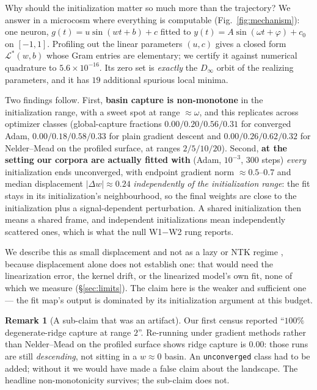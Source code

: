 \documentclass[10pt,letterpaper]{article}
\theoremstyle{definition}
\newtheorem{remark}[theorem]{Remark}
\newcommand{\Dinf}{D_\infty}
\begin{document}
Why should the initialization matter so much more than the trajectory? We answer in a microcosm
where everything is computable (Fig.~\ref{fig:mechanism}): one neuron, $g(t) = u\sin(wt+b)+c$ fitted to
$y(t) = A\sin(\omega t + \varphi) + c_0$ on $[-1,1]$. Profiling out the linear parameters
$(u,c)$ gives a closed form $\mathcal{L}^*(w,b)$ whose Gram entries are elementary; we certify it
against numerical quadrature to $5.6\times10^{-16}$. Its zero set is \emph{exactly} the $\Dinf$
orbit of the realizing parameters, and it has $19$ additional spurious local minima.

Two findings follow. First, \textbf{basin capture is non-monotone} in the initialization range,
with a sweet spot at range $\approx \omega$, and this replicates across optimizer classes
(global-capture fractions $0.00/0.20/0.56/0.31$ for converged Adam, $0.00/0.18/0.58/0.33$ for
plain gradient descent and $0.00/0.26/0.62/0.32$ for Nelder--Mead on the profiled surface, at
ranges $2/5/10/20$). Second, \textbf{at the setting our corpora are actually fitted with}
(Adam, $10^{-3}$, $300$ steps) \emph{every} initialization ends unconverged, with endpoint
gradient norm $\approx 0.5$--$0.7$ and median displacement $|\Delta w| \approx 0.24$
\emph{independently of the initialization range}: the fit stays in its initialization's
neighbourhood, so the final weights are close to the initialization plus a signal-dependent
perturbation. A shared initialization then means a shared frame, and independent initializations
mean independently scattered ones, which is what the null W1$-$W2 rung reports.

We describe this as small displacement and not as a lazy or NTK regime
\citep{jacot2018ntk,chizat2019lazy}, because displacement alone does not establish one: that would
need the linearization error, the kernel drift, or the linearized model's own fit, none of which we
measure (\S\ref{sec:limits}). The claim here is the weaker and sufficient one --- the fit map's
output is dominated by its initialization argument at this budget.

\begin{remark}[A sub-claim that was an artifact]
Our first census reported ``$100\%$ degenerate-ridge capture at range $2$''. Re-running under
gradient methods rather than Nelder--Mead on the profiled surface shows ridge capture is $0.00$:
those runs are still \emph{descending}, not sitting in a $w\approx0$ basin. An
\texttt{unconverged} class had to be added; without it we would have made a false claim about the
landscape. The headline non-monotonicity survives; the sub-claim does not.
\end{remark}
\end{document}
